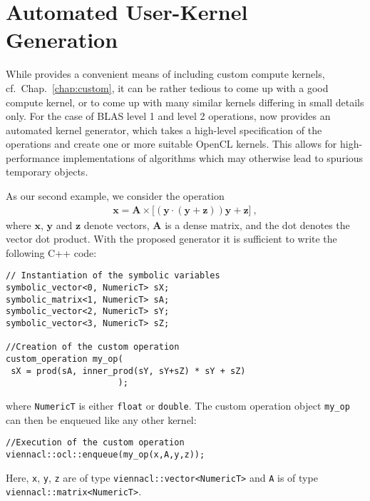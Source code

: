 \chapter{Automated User-Kernel Generation} \label{chap:kernel-generation}

While {\ViennaCL} provides a convenient means of including custom compute kernels, cf.~Chap.~\ref{chap:custom},
it can be rather tedious to come up with a good compute kernel, or to come up with many similar kernels differing in small details only.
For the case of BLAS level 1 and level 2 operations, {\ViennaCL} now provides an automated kernel generator, which takes a high-level specification of the operations and create one or more suitable OpenCL kernels.
This allows for high-performance implementations of algorithms which may otherwise lead to spurious temporary objects.

As our second example, we consider the operation
\begin{align*}
\mathbf{x} = \mathbf{A} \times \bigl[ (\mathbf{y} \cdot (\mathbf{y}+\mathbf{z}))\mathbf{y} + \mathbf{z} \bigr] \ ,
\end{align*}
where $\mathbf{x}$, $\mathbf{y}$ and $\mathbf{z}$ denote vectors, $\mathbf{A}$ is a dense matrix, and the dot denotes the vector dot product.
With the proposed generator it is sufficient to write the following C++ code:
\begin{lstlisting}
// Instantiation of the symbolic variables
symbolic_vector<0, NumericT> sX;
symbolic_matrix<1, NumericT> sA;
symbolic_vector<2, NumericT> sY;
symbolic_vector<3, NumericT> sZ;

//Creation of the custom operation
custom_operation my_op(
 sX = prod(sA, inner_prod(sY, sY+sZ) * sY + sZ)
                      );
\end{lstlisting}
where \lstinline|NumericT| is either \lstinline|float| or \lstinline|double|.
The custom operation object \lstinline|my_op| can then be enqueued like any other kernel:
\begin{lstlisting}
//Execution of the custom operation
viennacl::ocl::enqueue(my_op(x,A,y,z));
\end{lstlisting}
Here, \lstinline|x|, \lstinline|y|, \lstinline|z| are of type \lstinline|viennacl::vector<NumericT>| and \lstinline|A| is of type \lstinline|viennacl::matrix<NumericT>|.

